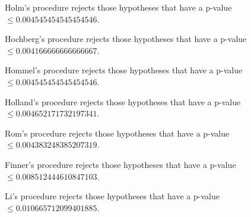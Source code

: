 \documentclass[a4paper,10pt]{article}
\begin{document}
\begin{landscape}
Holm's procedure rejects those hypotheses that have a p-value $\le0.004545454545454546$.


Hochberg's procedure rejects those hypotheses that have a p-value $\le0.004166666666666667$.


Hommel's procedure rejects those hypotheses that have a p-value $\le0.004545454545454546$.


Holland's procedure rejects those hypotheses that have a p-value $\le0.004652171732197341$.


Rom's procedure rejects those hypotheses that have a p-value $\le0.004383248385207319$.


Finner's procedure rejects those hypotheses that have a p-value $\le0.008512444610847103$.


Li's procedure rejects those hypotheses that have a p-value $\le0.010665712099401885$.



\newpage


\end{landscape}
\end{document}

